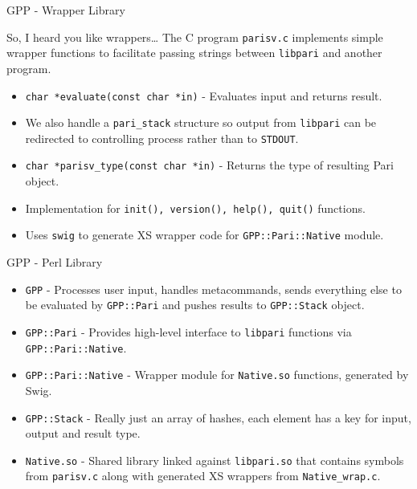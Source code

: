 \documentclass{beamer}
\begin{document}
\begin{frame}{GPP - Wrapper Library}

\begin{block}{So, I heard you like wrappers\dots}
The C program \texttt{parisv.c} implements simple wrapper functions to facilitate passing strings between \texttt{libpari} and another program.
\end{block}

\begin{itemize}
	\item \texttt{char *evaluate(const char *in)} - Evaluates input and returns result.
	\item We also handle a \texttt{pari\_stack} structure so output from 	\texttt{libpari} can be redirected to controlling process rather than to \texttt{STDOUT}.
	\item \texttt{char *parisv\_type(const char *in)} - Returns the type of resulting Pari object.
	\item Implementation for \texttt{init(), version(), help(), quit()} functions.
	\item Uses \texttt{swig} to generate XS wrapper code for \texttt{GPP::Pari::Native} module.
\end{itemize}

\end{frame}

\begin{frame}{GPP - Perl Library}

\begin{itemize}
	\item \texttt{GPP} - Processes user input, handles metacommands, sends everything else to be evaluated by \texttt{GPP::Pari} and pushes results to \texttt{GPP::Stack} object.
    \item \texttt{GPP::Pari} - Provides high-level interface to \texttt{libpari} functions via \texttt{GPP::Pari::Native}.
    \item \texttt{GPP::Pari::Native} - Wrapper module for \texttt{Native.so} functions, generated by Swig.
    \item \texttt{GPP::Stack} - Really just an array of hashes, each element has a key for input, output and result type.
    \item \texttt{Native.so} - Shared library linked against \texttt{libpari.so} that contains symbols from \texttt{parisv.c} along with generated XS wrappers from \texttt{Native\_wrap.c}.
\end{itemize}

\end{frame}
\end{document}
